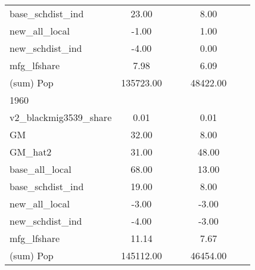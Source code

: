 \begin{table}[htbp]
\begin{tabular}{l*{2}{ccc}}
base\_schdist\_ind    &       23.00&            &            &        8.00&            &            \\
new\_all\_local       &       -1.00&            &            &        1.00&            &            \\
new\_schdist\_ind     &       -4.00&            &            &        0.00&            &            \\
mfg\_lfshare         &        7.98&            &            &        6.09&            &            \\
(sum) Pop           &   135723.00&            &            &    48422.00&            &            \\
\midrule
1960                &            &            &            &            &            &            \\
v2\_blackmig3539\_share&        0.01&            &            &        0.01&            &            \\
GM                  &       32.00&            &            &        8.00&            &            \\
GM\_hat2             &       31.00&            &            &       48.00&            &            \\
base\_all\_local      &       68.00&            &            &       13.00&            &            \\
base\_schdist\_ind    &       19.00&            &            &        8.00&            &            \\
new\_all\_local       &       -3.00&            &            &       -3.00&            &            \\
new\_schdist\_ind     &       -4.00&            &            &       -3.00&            &            \\
mfg\_lfshare         &       11.14&            &            &        7.67&            &            \\
(sum) Pop           &   145112.00&            &            &    46454.00&            &            \\
\bottomrule
\end{tabular}
\end{table}
